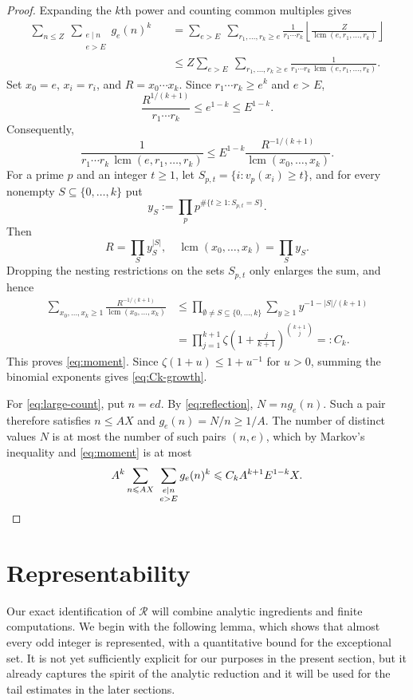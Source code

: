 \documentclass[11pt,letterpaper,reqno]{amsart}
\numberwithin{equation}{section}
\theoremstyle{remark}
\DeclareMathOperator{\lcm}{lcm}
\renewcommand{\leq}{\leqslant}
\renewcommand{\geq}{\geqslant}
\begin{document}
\begin{proof}
Expanding the $k$th power and counting common multiples gives
\begin{align*}
 \sum_{n\leq Z}\ \sum_{\substack{e\mid n\\e>E}}g_e(n)^k
 &\quad=\sum_{e>E}\ \sum_{r_1,\ldots,r_k\geq e}
 \frac1{r_1\cdots r_k}
 \left\lfloor\frac{Z}{\lcm(e,r_1,\ldots,r_k)}\right\rfloor\\
 &\quad\leq Z\sum_{e>E}\ \sum_{r_1,\ldots,r_k\geq e}
 \frac1{r_1\cdots r_k\,\lcm(e,r_1,\ldots,r_k)}.
\end{align*}
Set $x_0=e$, $x_i=r_i$, and $R=x_0\cdots x_k$. Since
$r_1\cdots r_k\geq e^k$ and $e>E$,
\[
 \frac{R^{1/(k+1)}}{r_1\cdots r_k}
 \leq e^{1-k}\leq E^{1-k}.
\]
Consequently,
\[
 \frac1{r_1\cdots r_k\,\lcm(e,r_1,\ldots,r_k)}
 \leq E^{1-k}\frac{R^{-1/(k+1)}}{\lcm(x_0,\ldots,x_k)}.
\]
For a prime $p$ and an integer $t\geq1$, let
$S_{p,t}=\{i:v_p(x_i)\geq t\}$, and for every nonempty
$S\subseteq\{0,\ldots,k\}$ put
\[
 y_S:=\prod_p p^{\#\{t\geq1:S_{p,t}=S\}}.
\]
Then
\[
 R=\prod_S y_S^{|S|},\quad \lcm(x_0,\ldots,x_k)=\prod_S y_S.
\]
Dropping the nesting restrictions on the sets $S_{p,t}$ only enlarges the
sum, and hence
\begin{align*}
 \sum_{x_0,\ldots,x_k\geq1}
 \frac{R^{-1/(k+1)}}{\lcm(x_0,\ldots,x_k)}
 &\leq\prod_{\emptyset\ne S\subseteq\{0,\ldots,k\}}
 \sum_{y\geq1}y^{-1-|S|/(k+1)}\\
 &=\prod_{j=1}^{k+1}
 \zeta\!\left(1+\frac{j}{k+1}\right)^{\binom{k+1}{j}}
 =:C_k.
\end{align*}
This proves \eqref{eq:moment}. Since
$\zeta(1+u)\leq1+u^{-1}$ for $u>0$, summing the binomial exponents gives
\eqref{eq:Ck-growth}.

For \eqref{eq:large-count}, put $n=ed$. By \eqref{eq:reflection},
$N=ng_e(n)$. Such a pair therefore satisfies
$n\leq AX$ and $g_e(n)=N/n\geq1/A$. The number of distinct values $N$ is
at most the number of such pairs $(n,e)$, which by Markov's inequality and
\eqref{eq:moment} is at most
\[
 A^k\sum_{n\leq AX}\ \sum_{\substack{e\mid n\\e>E}}g_e(n)^k
 \leq C_kA^{k+1}E^{1-k}X.
\qedhere \]
\end{proof}


\section{Representability}
\label{sec:representability}

Our exact identification of $\mathcal{R}$ will combine analytic ingredients and finite computations.
We begin with the following lemma, which shows that almost every odd integer is represented, with a quantitative bound for the exceptional set.
It is not yet sufficiently explicit for our purposes in the present section, but it already captures the spirit of the analytic reduction and it will be used for the tail estimates in the later sections.
\end{document}
